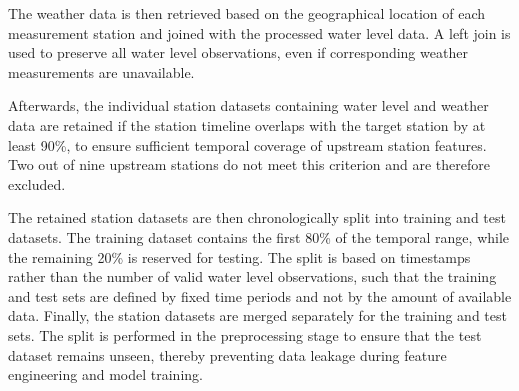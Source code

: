 The weather data \cite{geosphereaustriaINCAv11Meteorologische2021} is then retrieved based on the geographical location of each measurement station and joined with the processed water level data. A left join is used to preserve all water level observations, even if corresponding weather measurements are unavailable.

Afterwards, the individual station datasets containing water level and weather data are retained if the station timeline overlaps with the target station by at least 90\%, to ensure sufficient temporal coverage of upstream station features. Two out of nine upstream stations do not meet this criterion and are therefore excluded.

The retained station datasets are then chronologically split into training and test datasets. The training dataset contains the first 80\% of the temporal range, while the remaining 20\% is reserved for testing. The split is based on timestamps rather than the number of valid water level observations, such that the training and test sets are defined by fixed time periods and not by the amount of available data. Finally, the station datasets are merged separately for the training and test sets. The split is performed in the preprocessing stage to ensure that the test dataset remains unseen, thereby preventing data leakage during feature engineering and model training.

